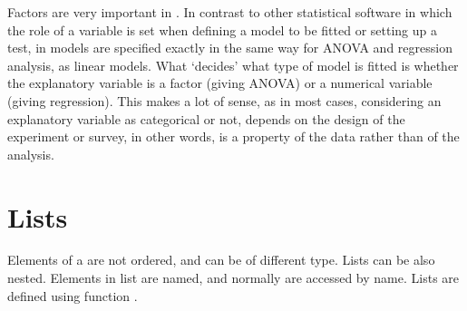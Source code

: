 \documentclass[paper=a4,10pt,div=17,headsepline,BCOR=12mm,twoside,open=right]{scrbook}\usepackage{knitr}
\begin{document}
Factors are very important in \R. In contrast to other statistical software in which the role of a variable is set when defining a model to be fitted or setting up a test, in \R models are specified exactly in the same way for ANOVA and regression analysis, as linear models. What `decides' what type of model is fitted is whether the explanatory variable is a factor (giving ANOVA) or a numerical variable (giving regression). This makes a lot of sense, as in most cases, considering an explanatory variable as categorical or not, depends on the design of the experiment or survey, in other words, is a property of the data rather than of the analysis.

\section{Lists}

Elements of a  are not ordered, and can be of different type. Lists can be also nested. Elements in list are named, and normally are accessed by name. Lists are defined using function .
\end{document}
